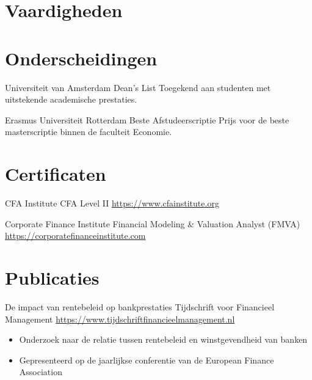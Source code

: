 \documentclass[a4paper, serif, 10pt]{moderncv}
\begin{document}
\section{Vaardigheden}

\section{Onderscheidingen}

        {Universiteit van Amsterdam}
        {Dean's List}
        {}
        {}
        {Toegekend aan studenten met uitstekende academische prestaties.}

        {Erasmus Universiteit Rotterdam}
        {Beste Afstudeerscriptie}
        {}
        {}
        {Prijs voor de beste masterscriptie binnen de faculteit Economie.}
\section{Certificaten}

        {CFA Institute}
        {CFA Level II}
        {\url{https://www.cfainstitute.org}}
        {}
        {}

        {Corporate Finance Institute}
        {Financial Modeling \& Valuation Analyst (FMVA)}
        {\url{https://corporatefinanceinstitute.com}}
        {}
        {}
\section{Publicaties}

        {De impact van rentebeleid op bankprestaties}
        {Tijdschrift voor Financieel Management}
        {\url{https://www.tijdschriftfinancieelmanagement.nl}}
        {}
        {\begin{itemize}
\item Onderzoek naar de relatie tussen rentebeleid en winstgevendheid van banken
\item Gepresenteerd op de jaarlijkse conferentie van de European Finance Association
\end{itemize}}
\end{document}
